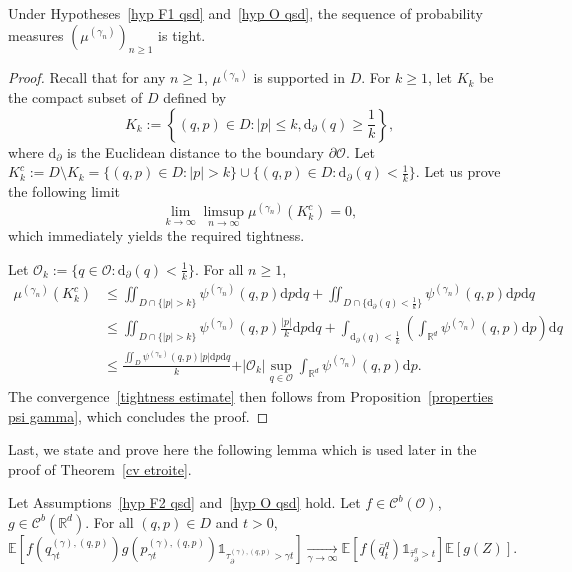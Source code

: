 \documentclass[preprint,EJP]{ejpecp}
\begin{document}
\begin{corollary}[Tightness]\label{tightness} Under Hypotheses~\ref{hyp F1 qsd} and~\ref{hyp O qsd}, the sequence of probability measures $(\mu^{(\gamma_n)})_{n\geq1}$ is tight. 
\end{corollary}
\begin{proof}
Recall that for any $n\geq1$, $\mu^{(\gamma_n)}$ is supported in $D$. For $k\geq1$, let $K_k$ be the compact subset of $D$ defined by   $$K_k:=\left\{(q,p)\in D : \vert p\vert\leq k, \mathrm{d}_\partial(q)\geq\frac{1}{k} \right\},$$
where $\mathrm{d}_\partial$ is the Euclidean distance to the boundary $\partial\mathcal{O}$. Let $K_k^c:=D\setminus K_k=\{(q,p)\in D : \vert p\vert> k\}\cup\{(q,p)\in D : \mathrm{d}_\partial(q)<\frac{1}{k}\}$. Let us prove the following limit
\begin{equation}\label{tightness estimate}
    \lim_{k\rightarrow\infty}\limsup_{n\rightarrow\infty}\mu^{(\gamma_n)}(K_k^c)=0, 
\end{equation} which immediately yields the required tightness.  

Let $\mathcal{O}_{k}:=\{q\in\mathcal{O} : \mathrm{d}_\partial(q)<\frac{1}{k}\}$. For all $n\geq1$,
\begin{align*}
     \mu^{(\gamma_n)}(K_k^c) 
    &\leq\iint_{D\cap\{\vert p\vert>k\}}\psi^{(\gamma_n)}(q,p) \mathrm{d}p \mathrm{d}q+\iint_{D\cap\{\mathrm{d}_\partial(q)<\frac{1}{k}\}}\psi^{(\gamma_n)}(q,p) \mathrm{d}p \mathrm{d}q\\
    &\leq\iint_{D\cap\{\vert p\vert>k\}}\psi^{(\gamma_n)}(q,p) \frac{\vert p\vert}{k} \mathrm{d}p \mathrm{d}q+\int_{\mathrm{d}_\partial(q)<\frac{1}{k}}\left(\int_{\mathbb{R}^d}\psi^{(\gamma_n)}(q,p) \mathrm{d}p\right) \mathrm{d}q\\
    &\leq\frac{\iint_{D}\psi^{(\gamma_n)}(q,p) \vert p\vert \mathrm{d}p \mathrm{d}q}{k}+\vert\mathcal{O}_k\vert \sup_{q\in\mathcal{O}}\int_{\mathbb{R}^d}\psi^{(\gamma_n)}(q,p) \mathrm{d}p .
\end{align*}
The convergence~\eqref{tightness estimate} then follows from Proposition~\ref{properties psi gamma}, which concludes the proof.
\end{proof}
Last, we state and prove here the following lemma which is used later in the proof of Theorem~\ref{cv etroite}.
\begin{lemma}\label{lem:cv loi discont}
Let Assumptions~\ref{hyp F2 qsd} and~\ref{hyp O qsd} hold. Let $f\in\mathcal{C}^b(\mathcal{O})$, $g\in\mathcal{C}^b(\mathbb{R}^d)$. For all $(q,p)\in D$ and $t>0$,
\begin{equation}\label{eq:cont distrib disc}
    \mathbb{E}\left[f(q^{(\gamma),(q,p)}_{\gamma t}) g(p^{(\gamma),(q,p)}_{\gamma t}) \mathbb{1}_{\tau^{(\gamma),(q,p)}_\partial>\gamma t}\right]\underset{\gamma\rightarrow\infty}{\longrightarrow}\mathbb{E}\left[f(\overline{q}^q_t) \mathbb{1}_{\overline{\tau}^{q}_\partial>t}\right] \mathbb{E}\left[g(Z)\right].
\end{equation}
\end{lemma}
\end{document}

